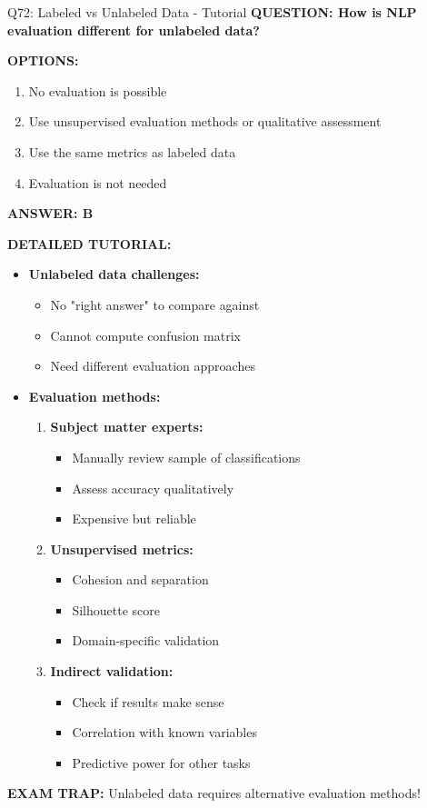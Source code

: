 \documentclass[8pt]{beamer}
\begin{document}
	\begin{frame}{Q72: Labeled vs Unlabeled Data - Tutorial}
		\fontsize{6.5}{7.5}\selectfont
		\textbf{QUESTION: How is NLP evaluation different for unlabeled data?}
		
		\vspace{0.1cm}
		\textbf{OPTIONS:}
		\begin{enumerate}
			\item No evaluation is possible
			\item Use unsupervised evaluation methods or qualitative assessment
			\item Use the same metrics as labeled data
			\item Evaluation is not needed
		\end{enumerate}
		
		\vspace{0.1cm}
		\textcolor{myblue}{\textbf{ANSWER: B}}
		
		\vspace{0.1cm}
		\textbf{DETAILED TUTORIAL:}
		\begin{itemize}
			\item \textbf{Unlabeled data challenges:}
			\begin{itemize}
				\item No "right answer" to compare against
				\item Cannot compute confusion matrix
				\item Need different evaluation approaches
			\end{itemize}
			\item \textbf{Evaluation methods:}
			\begin{enumerate}
				\item \textbf{Subject matter experts:}
				\begin{itemize}
					\item Manually review sample of classifications
					\item Assess accuracy qualitatively
					\item Expensive but reliable
				\end{itemize}
				\item \textbf{Unsupervised metrics:}
				\begin{itemize}
					\item Cohesion and separation
					\item Silhouette score
					\item Domain-specific validation
				\end{itemize}
				\item \textbf{Indirect validation:}
				\begin{itemize}
					\item Check if results make sense
					\item Correlation with known variables
					\item Predictive power for other tasks
				\end{itemize}
			\end{enumerate}
		\end{itemize}
		
		\textcolor{myred}{\textbf{EXAM TRAP:}} Unlabeled data requires \textcolor{myblue}{alternative evaluation methods}!
	\end{frame}
	
\end{document}

